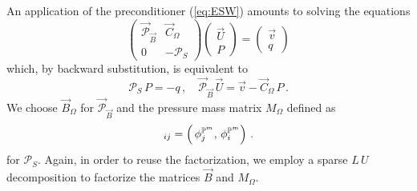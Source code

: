 An application of the preconditioner (\ref{eq:ESW}) amounts to solving the
equations
\begin{equation*}
\begin{pmatrix}
\vec{\mathcal{P}}_{\vec B} & \vec C_\Omega \\
0 & -\mathcal{P}_S
\end{pmatrix}
\begin{pmatrix} \vec U \\ P \end{pmatrix}
= \begin{pmatrix} \vec v \\ q \end{pmatrix}
\end{equation*}
which, by backward substitution, is equivalent to
\begin{equation}\label{eq:blocksolution}
\mathcal{P}_S\,P = -q\,,\quad \vec{\mathcal{P}}_{\vec B}\,\vec U = \vec v -
\vec C_\Omega\,P\,.
\end{equation}
We choose $\vec B_\Omega$  for $\vec{\mathcal{P}}_{\vec B}$ and the pressure
mass matrix $M_\Omega$ defined as
\begin{equation*}
[M_\Omega]_{ij} = \left(\,\phi_j^{\pspace^m},\, \phi_i^{\pspace^m}\right)\,.
\end{equation*}
for $\mathcal{P}_S$. Again, in order to reuse the factorization, we employ a
sparse $L\,U$ decomposition to factorize the matrices $\vec B$ and $M_\Omega$.

